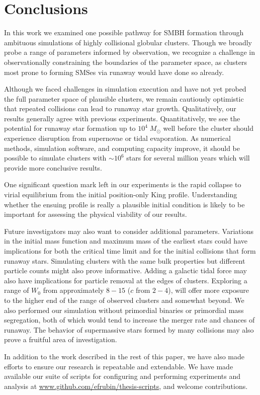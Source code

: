 \documentclass{princeton_astro_thesis}
\newcommand\Msun{\; M_\odot}
\numberwithin{equation}{section}
\begin{document}
\chapter{Conclusions} \label{ch:Conclusions}
In this work we examined one possible pathway for \ac{SMBH} formation through ambituous simulations of highly collisional globular clusters. Though we broadly probe a range of parameters informed by observation, we recognize a challenge in observationally constraining the boundaries of the parameter space, as clusters most prone to forming SMSes via runaway would have done so already.

Although we faced challenges in simulation execution and have not yet probed the full parameter space of plausible clusters, we remain cautiously optimistic that repeated collisions can lead to runaway star growth.  Qualitatively, our results generally agree with previous experiments. Quantitatively, we see the potential for runaway star formation up to $10^4 \Msun$ well before the cluster should experience disruption from supernovae or tidal evaporation. As numerical methods, simulation software, and computing capacity improve, it should be possible to simulate clusters with $\sim 10^6$ stars for several million years which will provide more conclusive results.

One significant question mark left in our experiments is the rapid collapse to virial equilibrium from the initial position-only King profile.  Understanding whether the ensuing profile is really a plausible initial condition is likely to be important for assessing the physical viability of our results.  

Future investigators may also want to consider additional parameters. Variations in the initial mass function and maximum mass of the earliest stars could have implications for both the critical time limit and for the initial collisions that form runaway stars. Simulating clusters with the same bulk properties but different particle counts might also prove informative. Adding a galactic tidal force may also have implications for particle removal at the edges of clusters. Exploring a range of $W_{0}$ from approximately $8 - 15$ ($c$ from $2 - 4$), will offer more exposure to the higher end of the range of observed clusters and somewhat beyond. We also performed our simulation without primordial binaries or primordial mass segregation, both of which would tend to increase the merger rate and chances of runaway.  The behavior of supermassive stars formed by many collisions may also prove a fruitful area of investigation.

In addition to the work described in the rest of this paper, we have also made efforts to ensure our research is repeatable and extendable. We have made available our suite of scripts for configuring and performing experiments and analysis at \url{www.github.com/efrubin/thesis-scripts}, and welcome contributions.




\nocite{*}
\end{document}
